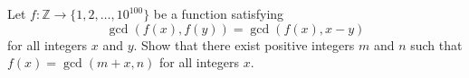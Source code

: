 Let $f: \mathbb Z\to \{1, 2, \dots, 10^{100}\}$ be a function satisfying 
$$\gcd(f(x), f(y)) = \gcd(f(x), x-y)$$ 
for all integers $x$ and $y$. Show that there exist positive integers $m$ and $n$ such that $f(x) = \gcd(m+x, n)$ for all integers $x$.